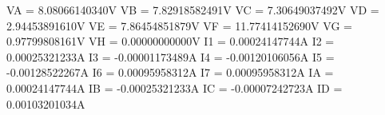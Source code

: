 VA = 8.08066140340V
VB = 7.82918582491V
VC = 7.30649037492V
VD = 2.94453891610V
VE = 7.86454851879V
VF = 11.77414152690V
VG = 0.97799808161V
VH = 0.00000000000V
I1 = 0.00024147744A
I2 = 0.00025321233A
I3 = -0.00001173489A
I4 = -0.00120106056A
I5 = -0.00128522267A
I6 = 0.00095958312A
I7 = 0.00095958312A
IA = 0.00024147744A
IB = -0.00025321233A
IC = -0.00007242723A
ID = 0.00103201034A
